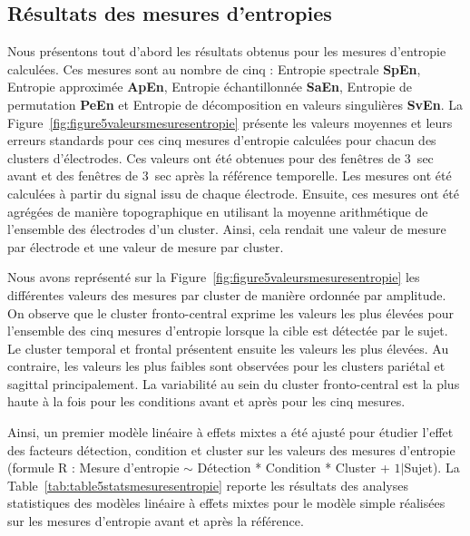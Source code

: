 \subsection{Résultats des mesures d'entropies}
\label{resultatsmesuresentropies}

Nous présentons tout d'abord les résultats obtenus pour les mesures d'entropie calculées. 
Ces mesures sont au nombre de cinq : Entropie spectrale \textbf{SpEn}, Entropie approximée \textbf{ApEn}, Entropie échantillonnée \textbf{SaEn}, Entropie de permutation \textbf{PeEn} et Entropie de décomposition en valeurs singulières \textbf{SvEn}.
La Figure~\ref{fig:figure5valeursmesuresentropie} présente les valeurs moyennes et leurs erreurs standards pour ces cinq mesures d'entropie calculées pour chacun des clusters d'électrodes. 
Ces valeurs ont été obtenues pour des fenêtres de $3$~sec avant et des fenêtres de $3$~sec après la référence temporelle. 
Les mesures ont été calculées à partir du signal issu de chaque électrode. 
Ensuite, ces mesures ont été agrégées de manière topographique en utilisant la moyenne arithmétique de l'ensemble des électrodes d'un cluster. 
Ainsi, cela rendait une valeur de mesure par électrode et une valeur de mesure par cluster. 

Nous avons représenté sur la Figure~\ref{fig:figure5valeursmesuresentropie} les différentes valeurs des mesures par cluster de manière ordonnée par amplitude. 
On observe que le cluster fronto-central exprime les valeurs les plus élevées pour l'ensemble des cinq mesures d'entropie lorsque la cible est détectée par le sujet. 
Le cluster temporal et frontal présentent ensuite les valeurs les plus élevées. 
Au contraire, les valeurs les plus faibles sont observées pour les clusters pariétal et sagittal principalement. 
La variabilité au sein du cluster fronto-central est la plus haute à la fois pour les conditions avant et après pour les cinq mesures. 

Ainsi, un premier modèle linéaire à effets mixtes a été ajusté pour étudier l'effet des facteurs détection, condition et cluster sur les valeurs des mesures d'entropie (formule R : Mesure d'entropie $\sim$ Détection * Condition * Cluster + $1|$Sujet). 
La Table~\ref{tab:table5statsmesuresentropie} reporte les résultats des analyses statistiques des modèles linéaire à effets mixtes pour le modèle simple réalisées sur les mesures d'entropie avant et après la référence. \\

